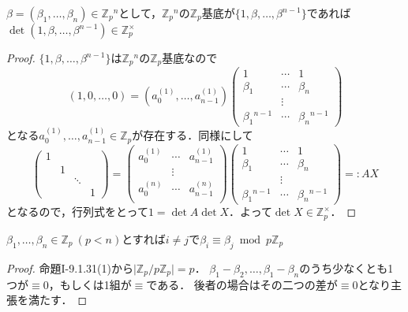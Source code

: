 \begin{screen}
  $\beta = (\beta_1, \ldots, \beta_n)\in\mathbb{Z}_p{}^n$として，$\mathbb{Z}_p{}^n$の$\mathbb{Z}_p$基底が$\{1, \beta, \ldots, \beta^{n-1}\}$であれば$\det(1, \beta, \ldots, \beta^{n-1})\in\mathbb{Z}_p^\times$
\end{screen}
\begin{proof}
  $\{1, \beta, \ldots, \beta^{n-1}\}$は$\mathbb{Z}_p{}^n$の$\mathbb{Z}_p$基底なので
  \[(1, 0, \ldots, 0)=(a_0^{(1)}, \ldots, a_{n-1}^{(1)})
  \begin{pmatrix}
    1               & \cdots & 1\\
    \beta_1         & \cdots & \beta_n\\
    & \vdots & \\
    \beta_1{}^{n-1} & \cdots & \beta_n{}^{n-1}
  \end{pmatrix}
  \]
  となる$a_0^{(1)}, \ldots, a_{n-1}^{(1)}\in\mathbb{Z}_p$が存在する．同様にして
  \[
  \begin{pmatrix}
    1 &   &        & \\
    & 1 &        & \\
    &   & \ddots & \\
    &   &        & 1
  \end{pmatrix}
  =
  \begin{pmatrix}
    a_0^{(1)} & \cdots & a_{n-1}^{(1)} \\
    & \vdots & \\
    a_0^{(n)} & \cdots & a_{n-1}^{(n)} \\
  \end{pmatrix}
  \begin{pmatrix}
    1               & \cdots & 1\\
    \beta_1         & \cdots & \beta_n\\
    & \vdots & \\
    \beta_1{}^{n-1} & \cdots & \beta_n{}^{n-1}
  \end{pmatrix}
  =:AX
  \]
  となるので，行列式をとって$1=\det A\det X$．よって$\det X\in\mathbb{Z}_p^\times$．
\end{proof}

\begin{screen}
  $\beta_1, \ldots, \beta_n\in\mathbb{Z}_p\ (p< n)$とすれば$i\neq j$で$\beta_i\equiv\beta_j\bmod p\mathbb{Z}_p$
\end{screen}
\begin{proof}
  命題I-9.1.31(1)から$\lvert\mathbb{Z}_p/p\mathbb{Z}_p\rvert=p$．
  $\beta_1-\beta_2, \ldots, \beta_1-\beta_n$のうち少なくとも1つが$\equiv0$，もしくは1組が$\equiv$である．
  後者の場合はその二つの差が$\equiv0$となり主張を満たす．
\end{proof}

